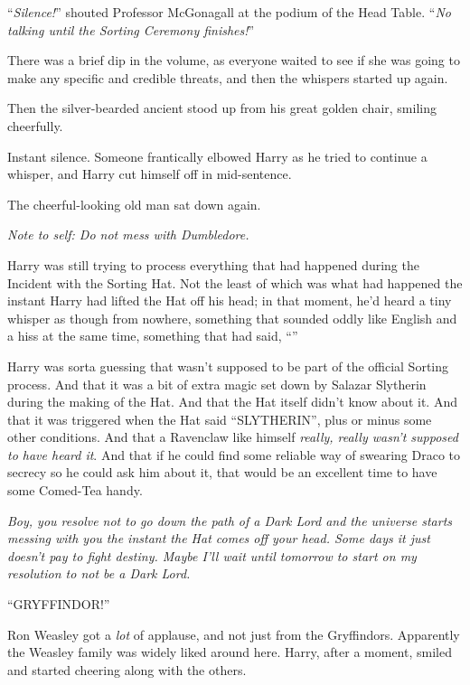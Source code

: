 “\emph{Silence!}” shouted Professor McGonagall at the podium of the Head Table. “\emph{No talking until the Sorting Ceremony finishes!}”

There was a brief dip in the volume, as everyone waited to see if she was going to make any specific and credible threats, and then the whispers started up again.

Then the silver-bearded ancient stood up from his great golden chair, smiling cheerfully.

Instant silence. Someone frantically elbowed Harry as he tried to continue a whisper, and Harry cut himself off in mid-sentence.

The cheerful-looking old man sat down again.

\emph{Note to self: Do not mess with Dumbledore.}

Harry was still trying to process everything that had happened during the Incident with the Sorting Hat. Not the least of which was what had happened the instant Harry had lifted the Hat off his head; in that moment, he’d heard a tiny whisper as though from nowhere, something that sounded oddly like English and a hiss at the same time, something that had said, “”

Harry was sorta guessing that wasn’t supposed to be part of the official Sorting process. And that it was a bit of extra magic set down by Salazar Slytherin during the making of the Hat. And that the Hat itself didn’t know about it. And that it was triggered when the Hat said “SLYTHERIN”, plus or minus some other conditions. And that a Ravenclaw like himself \emph{really, really wasn’t supposed to have heard it}. And that if he could find some reliable way of swearing Draco to secrecy so he could ask him about it, that would be an excellent time to have some Comed-Tea handy.

\emph{Boy, you resolve not to go down the path of a Dark Lord and the universe starts messing with you the instant the Hat comes off your head. Some days it just doesn’t pay to fight destiny. Maybe I’ll wait until tomorrow to start on my resolution to not be a Dark Lord.}

“GRYFFINDOR!”

Ron Weasley got a \emph{lot} of applause, and not just from the Gryffindors. Apparently the Weasley family was widely liked around here. Harry, after a moment, smiled and started cheering along with the others.

